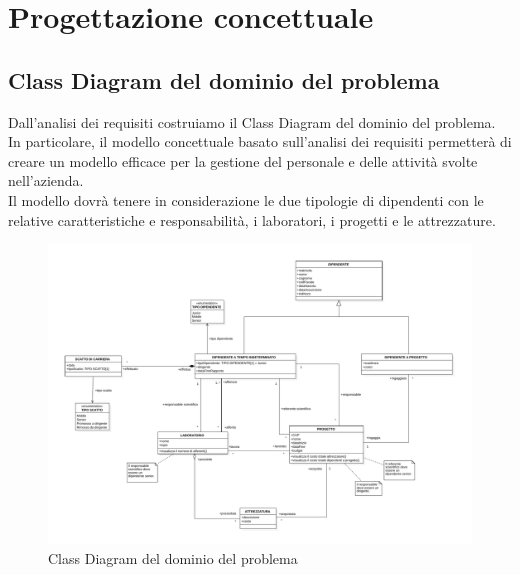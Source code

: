 \chapter{Progettazione concettuale}
    \section{Class Diagram del dominio del problema}
        Dall'analisi dei requisiti costruiamo il Class Diagram del dominio del problema.\\
        In particolare, il modello concettuale basato sull'analisi dei requisiti permetterà di creare un modello efficace per la gestione del personale e delle attività svolte nell'azienda.\\
        Il modello dovrà tenere in considerazione le due tipologie di dipendenti con le relative caratteristiche e responsabilità, i laboratori, i progetti e le attrezzature.\\
        \begin{figure}[htbp!]
            \centering
                \vspace{2\baselineskip}
                \includegraphics[width=\linewidth]{Immagini/Diagrammi/Class Diagram/Class diagram del dominio del problema.pdf}
            \caption{Class Diagram del dominio del problema}
            \label{fig:Class Diagram del dominio del problema}
        \end{figure}

